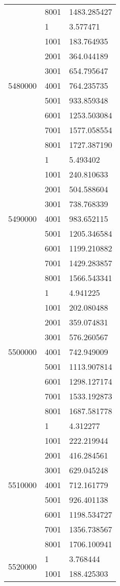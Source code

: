 \begin{table}[htb!]
\begin{tabular}{lll}
 & 8001 & 1483.285427 \\
\multirow[c]{9}{*}{5480000} & 1 & 3.577471 \\
 & 1001 & 183.764935 \\
 & 2001 & 364.044189 \\
 & 3001 & 654.795647 \\
 & 4001 & 764.235735 \\
 & 5001 & 933.859348 \\
 & 6001 & 1253.503084 \\
 & 7001 & 1577.058554 \\
 & 8001 & 1727.387190 \\
\multirow[c]{9}{*}{5490000} & 1 & 5.493402 \\
 & 1001 & 240.810633 \\
 & 2001 & 504.588604 \\
 & 3001 & 738.768339 \\
 & 4001 & 983.652115 \\
 & 5001 & 1205.346584 \\
 & 6001 & 1199.210882 \\
 & 7001 & 1429.283857 \\
 & 8001 & 1566.543341 \\
\multirow[c]{9}{*}{5500000} & 1 & 4.941225 \\
 & 1001 & 202.080488 \\
 & 2001 & 359.074831 \\
 & 3001 & 576.260567 \\
 & 4001 & 742.949009 \\
 & 5001 & 1113.907814 \\
 & 6001 & 1298.127174 \\
 & 7001 & 1533.192873 \\
 & 8001 & 1687.581778 \\
\multirow[c]{9}{*}{5510000} & 1 & 4.312277 \\
 & 1001 & 222.219944 \\
 & 2001 & 416.284561 \\
 & 3001 & 629.045248 \\
 & 4001 & 712.161779 \\
 & 5001 & 926.401138 \\
 & 6001 & 1198.534727 \\
 & 7001 & 1356.738567 \\
 & 8001 & 1706.100941 \\
\multirow[c]{9}{*}{5520000} & 1 & 3.768444 \\
 & 1001 & 188.425303 \\

\end{tabular}
\end{table}
